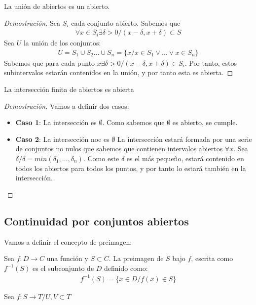 \documentclass{../Topologia.tex}
\begin{document}
\begin{prop}
	La unión de abiertos es un abierto.
\end{prop}
\begin{proof}[Demostración]
	Sea $S_{i}$ cada conjunto abierto. Sabemos que
	\begin{equation}
		\begin{split}
			\forall x \in S_{i} \exists \delta > 0 / (x-\delta, x+\delta) \subset S
		\end{split}
	\end{equation}
	Sea $U$ la unión de los conjuntos:
	\begin{equation}
		\begin{split}
			U = S_{1} \cup S_{2}\dots \cup S_{n} = 
			\{ x / x \in S_{1} \vee \dots \vee x \in S_{n} \}
		\end{split}
	\end{equation}
	Sabemos que para cada punto $x \exists \delta > 0 / (x-\delta,x+\delta) \in S_{i}$.
	Por tanto, estos subintervalos estarán contenidos en la unión, y por tanto
	esta es abierta.
\end{proof}
\begin{prop}
	La intersección finita de abiertos es abierta
\end{prop}
\begin{proof}[Demostración]
	Vamos a definir dos casos:
	\begin{itemize}
		\item \textbf{Caso 1}: La intersección es $\emptyset$. 
		Como sabemos que $\emptyset$ es abierto, se cumple.
		\item \textbf{Caso 2}: La intersección noe es $\emptyset$
		La intersección estará formada por una serie de conjuntos no nulos que
		sabemos que contienen intervalos abiertos $\forall x$. Sea $\delta
		 / \delta = min(\delta_{1}, \dots ,\delta_{n})$. Como este $\delta$
		 es el más pequeño, estará contenido en todos los abiertos para
		 todos los puntos, y por tanto lo estará también en la intersección.
	\end{itemize}
\end{proof}
\subsection{Continuidad por conjuntos abiertos}
Vamos a definir el concepto de preimagen:
\begin{defin}
	Sea $f:D \to C$ una función y $S\subset C$. La preimagen de $S$ bajo $f$,
	escrita como $f^{-1}(S)$ es el subconjunto de $D$ definido como:
	\begin{equation}
		\begin{split}
			f^{-1}(S) = \{ x \in D / f(x) \in S \}
		\end{split}
	\end{equation}
\end{defin}

Sea $f:S \to T / U,V \subset T$
\end{document}
